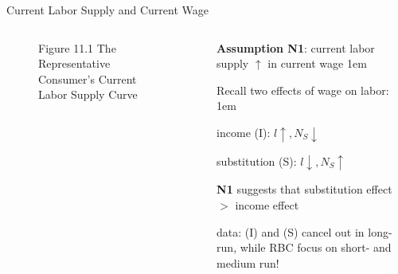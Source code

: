 \documentclass[11pt,aspectratio=43]{beamer}
\let\olditemize=\itemize
\let\endolditemize=\enditemize
\renewenvironment{itemize}{\olditemize \itemsep1em}{\endolditemize}
\theoremstyle{definition}
\begin{document}
\begin{frame}{Current Labor Supply and Current Wage}
\label{slide:Current_Labor_Supply_and_Current_Wage}
    \begin{columns}
        \begin{column}{0.5\textwidth}
            \begin{figure}
                \caption{\scriptsize Figure 11.1  The Representative Consumer’s Current Labor Supply Curve}
            \end{figure}
        \end{column}
        \begin{column}{0.5\textwidth}
            \textbf{Assumption N1}: current labor supply $ \uparrow  $ in current wage
            \begin{itemize}
                \item Recall two effects of wage on labor:
                \begin{itemize}
                    \item income (I): $ l\uparrow, N_{S}\downarrow   $
                    \item substitution (S): $ l\downarrow, N_{S}\uparrow   $
                \end{itemize}
                \item \textbf{N1} suggests that \alert{substitution effect $ > $ income effect}
                \item data: (I) and (S) cancel out in long-run, while RBC focus on \alert{short- and medium run}!
            \end{itemize}
        \end{column}
    \end{columns}
\end{frame}
\end{document}
